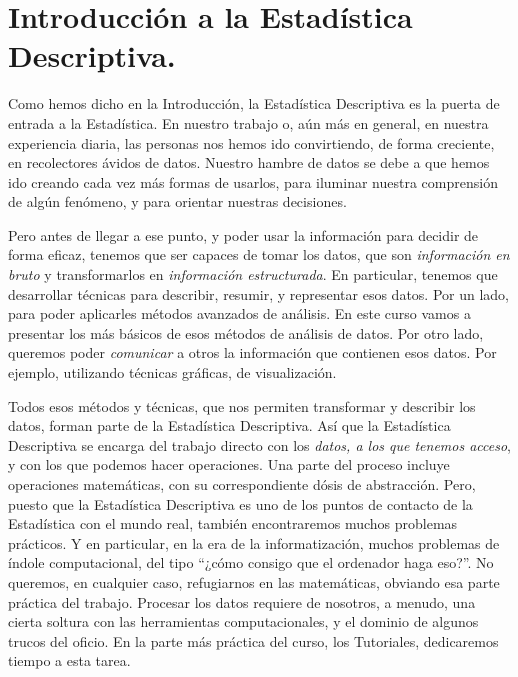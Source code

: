 
\section*{Introducción a la Estadística Descriptiva.}
\label{part01:intro}

Como hemos dicho en la Introducción, la Estadística Descriptiva es la puerta de entrada a la
Estadística. En nuestro trabajo o, aún más en general, en nuestra experiencia diaria, las
personas nos hemos ido convirtiendo, de forma creciente, en recolectores ávidos de datos. Nuestro
hambre de datos se debe a que hemos ido creando cada vez más formas de usarlos, para iluminar
nuestra comprensión de algún fenómeno, y para orientar nuestras decisiones.

Pero antes de llegar a ese punto, y poder usar la información para decidir de forma eficaz, tenemos
que ser capaces de tomar los datos, que son {\em información en bruto} y transformarlos en {\em
información estructurada}. En particular, tenemos que desarrollar técnicas para describir, resumir,
y representar esos datos. Por un lado, para poder aplicarles métodos avanzados de análisis. En este
curso vamos a presentar los más básicos de esos métodos de análisis de datos. Por otro lado,
queremos poder {\em comunicar} a otros la información que contienen esos datos. Por ejemplo,
utilizando técnicas gráficas, de visualización.

Todos esos métodos y técnicas, que nos permiten transformar y describir los datos, forman parte de
la  {\sf Estadística Descriptiva}. Así que la Estadística
Descriptiva se encarga del trabajo directo con los {\em datos, a los que tenemos acceso}, y con los
que podemos hacer operaciones. Una parte del proceso incluye operaciones matemáticas, con su
correspondiente dósis de abstracción. Pero, puesto que la Estadística Descriptiva es uno de los
puntos de contacto de la Estadística con el mundo real, también encontraremos muchos problemas
prácticos. Y en particular, en la era de la informatización, muchos problemas de índole
computacional, del tipo ``¿cómo consigo que el ordenador haga eso?''. No queremos, en cualquier caso,
refugiarnos en las matemáticas, obviando esa parte práctica del trabajo. Procesar los datos requiere de
nosotros, a menudo, una cierta soltura con las herramientas computacionales, y el dominio de
algunos trucos del oficio. En la parte más práctica del curso, los Tutoriales, dedicaremos tiempo a
esta tarea.

